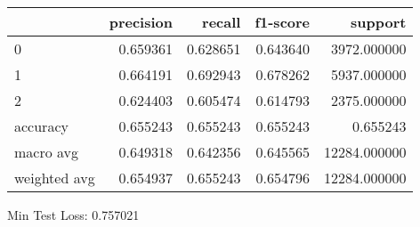 \begin{tabular}{lrrrr}
\toprule
{} &  precision &    recall &  f1-score &       support \\
\midrule
0            &   0.659361 &  0.628651 &  0.643640 &   3972.000000 \\
1            &   0.664191 &  0.692943 &  0.678262 &   5937.000000 \\
2            &   0.624403 &  0.605474 &  0.614793 &   2375.000000 \\
accuracy     &   0.655243 &  0.655243 &  0.655243 &      0.655243 \\
macro avg    &   0.649318 &  0.642356 &  0.645565 &  12284.000000 \\
weighted avg &   0.654937 &  0.655243 &  0.654796 &  12284.000000 \\
\bottomrule
\end{tabular}

Min Test Loss: 0.757021